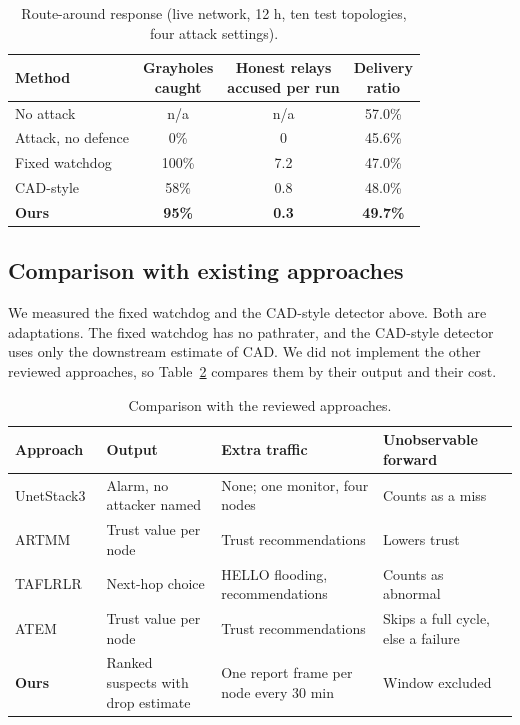 \documentclass[11pt]{article}
\begin{document}
\begin{table}[htbp]
\centering\small
\caption{Route-around response (live network, 12 h, ten test topologies, four attack settings).}\label{tab:live}
\begin{tabular}{l c c c}
\toprule
Method & \shortstack{Grayholes\\caught} & \shortstack{Honest relays\\accused per run} & \shortstack{Delivery\\ratio} \\
\midrule
No attack & n/a & n/a & 57.0\% \\
Attack, no defence & 0\% & 0 & 45.6\% \\
Fixed watchdog & 100\% & 7.2 & 47.0\% \\
CAD-style & 58\% & 0.8 & 48.0\% \\
\textbf{Ours} & \textbf{95\%} & \textbf{0.3} & \textbf{49.7\%} \\
\bottomrule
\end{tabular}
\end{table}

\subsection{Comparison with existing approaches}\label{sec:res-compare}
\noindent
We measured the fixed watchdog and the CAD-style detector above.
Both are adaptations.
The fixed watchdog has no pathrater, and the CAD-style detector uses only the downstream estimate of CAD.
We did not implement the other reviewed approaches, so Table~\ref{tab:sota} compares them by their output and their cost.

\begin{table}[htbp]
\centering\footnotesize\setlength{\tabcolsep}{4pt}
\caption{Comparison with the reviewed approaches.}\label{tab:sota}
\begin{tabular}{>{\raggedright\arraybackslash}p{2.4cm} >{\raggedright\arraybackslash}p{3.6cm} >{\raggedright\arraybackslash}p{4.2cm} >{\raggedright\arraybackslash}p{4.4cm}}
\toprule
Approach & Output & Extra traffic & Unobservable forward \\
\midrule
UnetStack3~\cite{brc2021} & Alarm, no attacker named & None; one monitor, four nodes & Counts as a miss \\
ARTMM~\cite{han2015} & Trust value per node & Trust recommendations & Lowers trust \\
TAFLRLR~\cite{han2023} & Next-hop choice & HELLO flooding, recommendations & Counts as abnormal \\
ATEM~\cite{liu2024} & Trust value per node & Trust recommendations & Skips a full cycle, else a failure \\
\textbf{Ours} & Ranked suspects with drop estimate & One report frame per node every 30 min & Window excluded \\
\bottomrule
\end{tabular}
\end{table}
\end{document}
